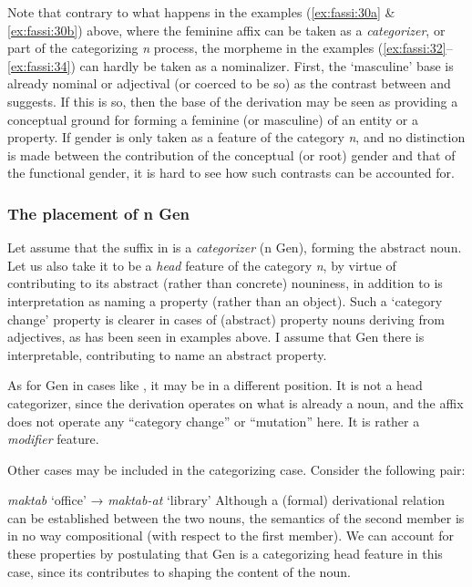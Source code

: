Note that contrary to what happens in the examples (\ref{ex:fassi:30a} \&
\ref{ex:fassi:30b}) above, where the feminine affix  can be taken as a
\textit{categorizer}, or part of the categorizing \textit{n} process, the
morpheme in the examples (\ref{ex:fassi:32}--\ref{ex:fassi:34}) can hardly be
taken as a nominalizer. First, the `masculine' base is already nominal or
adjectival (or coerced to be so) as the contrast between  and
 suggests. If this is so, then the base of the derivation may
be seen as providing a conceptual ground for forming a feminine (or masculine)
of an entity or a property. If gender is only taken as a feature of the
category \textit{n}, and no distinction is made between the contribution of the
conceptual (or root) gender and that of the functional gender, it is hard to
see how such contrasts can be accounted for.

\subsubsection{The placement of n Gen}

Let assume that the suffix  in  is a
\textit{categorizer} (n Gen), forming the abstract noun. Let us also take it to
be a \textit{head} feature of the category \textit{n}, by virtue of
contributing to its abstract (rather than concrete) nouniness, in addition to
is interpretation as naming a property (rather than an object). Such a
`category change' property is clearer in cases of (abstract) property nouns
deriving from adjectives, as has been seen in examples  above.
I assume that Gen there is interpretable, contributing to name an abstract
property.

As for Gen in cases like , it may be in a different position.
It is not a head categorizer, since the derivation operates on what is already
a noun, and the affix does not operate any ``category change'' or  ``mutation''
here. It is rather a \textit{modifier} feature.

Other cases may be included in the categorizing case. Consider the following
pair:

\ea \label{ex:fassi:36}
\textit{maktab} ‘office’ → \textit{maktab-at} ‘library’
\z
%
Although a (formal) derivational relation can be established between the two
nouns, the semantics of the second member is in no way compositional (with
respect to the first member). We can account for these properties by
postulating that Gen is a categorizing head feature in this case, since its
contributes to shaping the content of the noun.

